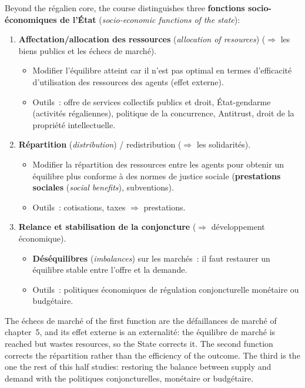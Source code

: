 Beyond the régalien core, the course distinguishes three \textbf{fonctions
socio-économiques de l'État} (\textit{socio-economic functions of the state}):

\begin{enumerate}
  \item \textbf{Affectation/\allowbreak allocation des ressources}
    (\textit{allocation of resources}) ($\Rightarrow$ les biens publics et les
    échecs de marché).
    \begin{itemize}
      \item Modifier l'équilibre atteint car il n'est pas optimal en termes
        d'efficacité d'utilisation des ressources des agents (effet externe).
      \item Outils~: offre de services collectifs publics et droit, État-gendarme
        (activités régaliennes), politique de la concurrence, Antitrust, droit de
        la propriété intellectuelle.
    \end{itemize}
  \item \textbf{Répartition} (\textit{distribution}) / redistribution
    ($\Rightarrow$ les solidarités).
    \begin{itemize}
      \item Modifier la répartition des ressources entre les agents pour obtenir
        un équilibre plus conforme à des normes de justice sociale
        (\textbf{prestations sociales} (\textit{social benefits}), subventions).
      \item Outils~: cotisations, taxes $\Rightarrow$ prestations.
    \end{itemize}
  \item \textbf{Relance et stabilisation de la conjoncture} ($\Rightarrow$
    développement économique).
    \begin{itemize}
      \item \textbf{Déséquilibres} (\textit{imbalances}) sur les marchés~: il faut
        restaurer un équilibre stable entre l'offre et la demande.
      \item Outils~: politiques économiques de régulation conjoncturelle
        monétaire ou budgétaire.
    \end{itemize}
\end{enumerate}

The échecs de marché of the first function are the défaillances de marché of
chapter~5, and its effet externe is an externalité: the équilibre de marché is
reached but wastes resources, so the State corrects it. The second function
corrects the répartition rather than the efficiency of the outcome. The third
is the one the rest of this half studies: restoring the balance between supply
and demand with the politiques conjoncturelles, monétaire or budgétaire.

